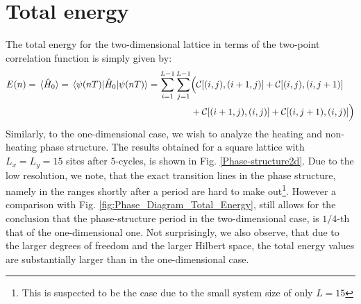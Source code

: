 \documentclass[11pt, a4paper, oneside]{book}
\theoremstyle{definition} %
\begin{document}
\section{Total energy}
The total energy for the two-dimensional lattice in terms of the two-point correlation function is simply given by:
\begin{equation}
\begin{split}
E(n) =\expval*{\hat{H}_0} = \mel{\psi(nT)}{\hat{H}_0}{\psi(nT)} = \sum_{i=1}^{L-1}\sum_{j=1}^{L-1} & \Big(\mathcal{C}[(i,j),(i+1,j)] + \mathcal{C}[(i,j), (i, j+1)] \\
 &+ \mathcal{C}[(i+1,j),(i,j)] + \mathcal{C}[(i,j+1), (i,j)] \Big)
\end{split}
\end{equation}
Similarly, to the one-dimensional case, we wish to analyze the heating and non-heating phase structure. The results obtained for a square lattice with $L_x = L_y = 15$ sites after $5$-cycles, is shown in Fig. \ref{Phase-structure2d}. Due to the low resolution, we note, that the exact transition lines in the phase structure, namely in the ranges shortly after a period are hard to make out\footnote{This is suspected to be the case due to the small system size of only $L = 15$}. However a comparison with Fig. \ref{fig:Phase_Diagram_Total_Energy}, still allows for the conclusion that the phase-structure period in the two-dimensional case, is $1/4$-th that of the one-dimensional one.  Not surprisingly, we also observe, that due to the larger degrees of freedom and the larger Hilbert space, the total energy values are substantially larger than in the one-dimensional case. \\
\end{document}
